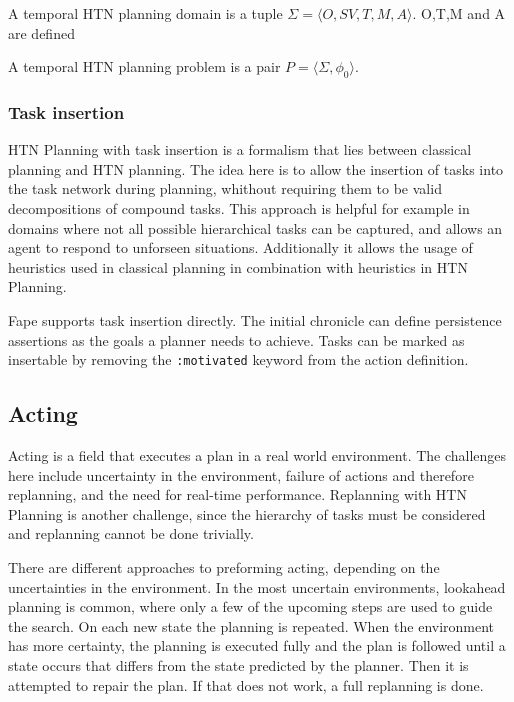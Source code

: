 A temporal HTN planning domain is a tuple $\Sigma = \langle O,SV,T,M,A \rangle$.
O,T,M and A are defined 

A temporal HTN planning problem is a pair $P = \langle \Sigma, \phi_0 \rangle$.





\subsubsection{Task insertion}

HTN Planning with task insertion is a formalism that lies between classical planning and HTN planning.
The idea here is to allow the insertion of tasks into the task network during planning, whithout requiring them to be valid decompositions of compound tasks.
This approach is helpful for example in domains where not all possible hierarchical tasks can be captured, and allows an agent to respond to unforseen situations.
Additionally it allows the usage of heuristics used in classical planning in combination with heuristics in HTN Planning.

Fape supports task insertion directly.
The initial chronicle can define persistence assertions as the goals a planner needs to achieve.
Tasks can be marked as insertable by removing the \verb|:motivated| keyword from the action definition.



\subsection{Acting}\label{sec:acting}

Acting is a field that executes a plan in a real world environment.
The challenges here include uncertainty in the environment, failure of actions and therefore replanning, and the need for real-time performance.
Replanning with HTN Planning is another challenge, since the hierarchy of tasks must be considered and replanning cannot be done trivially.

There are different approaches to preforming acting, depending on the uncertainties in the environment.
In the most uncertain environments, lookahead planning is common, where only a few of the upcoming steps are used to guide the search. 
On each new state the planning is repeated.
When the environment has more certainty, the planning is executed fully and the plan is followed until a state occurs that differs from the state predicted by the planner.
Then it is attempted to repair the plan. 
If that does not work, a full replanning is done.


